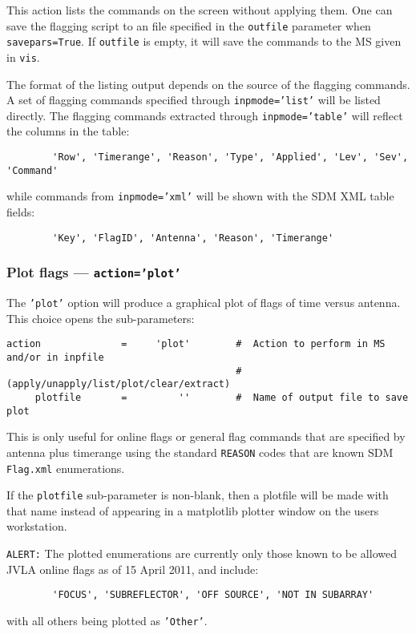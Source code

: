 This action lists the commands on the screen without applying
them. One can save the flagging script to an file specified in the
{\tt outfile} parameter when {\tt savepars=True}. If {\tt outfile} is
empty, it will save the commands to the MS given in {\tt vis}.



The format of the listing output depends on the source of the flagging
commands. A set of flagging commands specified through 
{\tt inpmode='list'} will be listed directly. The
flagging commands extracted through {\tt inpmode='table'} will
reflect the columns in the table:
\begin{verbatim}
        'Row', 'Timerange', 'Reason', 'Type', 'Applied', 'Lev', 'Sev', 'Command'
\end{verbatim}
while commands from {\tt inpmode='xml'} will be shown with the SDM
XML table fields:
\begin{verbatim}
        'Key', 'FlagID', 'Antenna', 'Reason', 'Timerange'
\end{verbatim}



\subsubsection{Plot flags --- {\tt action='plot'}}
\label{section:edit.flagcmd.action.plot}

The {\tt 'plot'} option will produce a graphical plot of flags of time versus antenna.
This choice opens the sub-parameters:
\small
\begin{verbatim}
action              =     'plot'        #  Action to perform in MS and/or in inpfile
                                        #   (apply/unapply/list/plot/clear/extract)
     plotfile       =         ''        #  Name of output file to save plot
\end{verbatim}
\normalsize
This is only useful for online flags or general flag commands that are
specified by antenna plus timerange using the standard {\tt REASON}
codes that are known SDM {\tt Flag.xml} enumerations.

If the {\tt plotfile} sub-parameter is non-blank, then a plotfile will
be made with that name instead of appearing in a matplotlib plotter window
on the users workstation.

{\tt ALERT:} The plotted enumerations are currently only those known
to be allowed JVLA online flags as of 15 April 2011, and include:
\begin{verbatim}
        'FOCUS', 'SUBREFLECTOR', 'OFF SOURCE', 'NOT IN SUBARRAY'
\end{verbatim}
with all others being plotted as {\tt 'Other'}.

